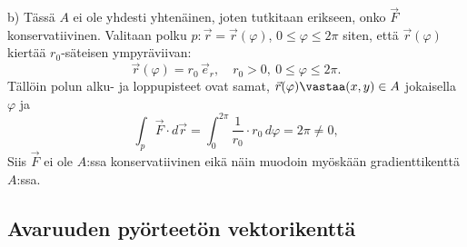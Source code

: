 b) Tässä $A$ ei ole yhdesti yhtenäinen, joten tutkitaan erikseen, onko $\vec F$ 
konservatiivinen. Valitaan polku $p:\vec r=\vec r(\varphi)$, $0\leq\varphi\leq 2\pi$ siten,
että $\vec r(\varphi)$ kiertää $r_0$-säteisen ympyräviivan:
\[
\vec r(\varphi)=r_0\,\vec e_r,\quad r_0>0,\ 0\leq\varphi\leq 2\pi.
\]
Tällöin polun alku- ja loppupisteet ovat samat, $\vec r(\varphi)\vastaa (x,y)\in A$ jokaisella
$\varphi$ ja
\[
\int_p \vec F\cdot d\vec r=\int_0^{2\pi} \frac{1}{r_0}\cdot r_0\,d\varphi=2\pi\neq 0,
\]
Siis $\vec F$ ei ole $A$:ssa konservatiivinen eikä näin muodoin myöskään gradienttikenttä
$A$:ssa. \loppu

\subsection{Avaruuden pyörteetön vektorikenttä}

